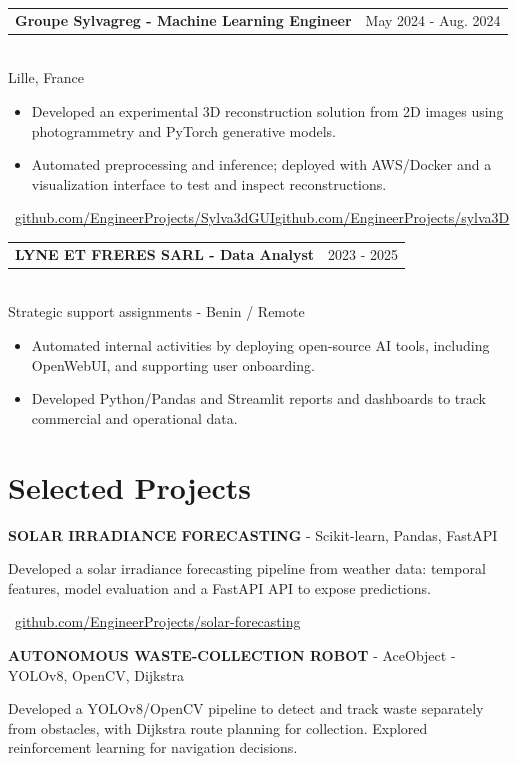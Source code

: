 \documentclass[10pt,a4paper]{article}
\makeatletter
\newcommand{\role}[3]{%
  \vspace{3pt}
  \begin{tabularx}{\linewidth}{@{}Xr@{}}
  \textbf{#1} & {\color{muted}#2}
  \end{tabularx}\vspace{0.8pt}\\
  {\color{muted}#3}\par
  \vspace{3pt}
}
\newcommand{\projectline}[2]{\textbf{#1} - #2\par}
\newcommand{\githublink}[2]{\par{\footnotesize\color{accent}\faIcon{github}\ \href{#1}{#2}}\par}
\newlength{\maincolumnheight}
\makeatother
\begin{document}
\begin{lrbox}{\maincolumnbox}
\begin{minipage}[t]{0.695\textwidth}
\vspace{8pt}
\role{Groupe Sylvagreg - Machine Learning Engineer}{May 2024 - Aug. 2024}{Lille, France}
\begin{itemize}
  \item Developed an experimental 3D reconstruction solution from 2D images using photogrammetry and PyTorch generative models.
  \item Automated preprocessing and inference; deployed with AWS/Docker and a visualization interface to test and inspect reconstructions.
\end{itemize}
{\fontsize{7.5pt}{9pt}\selectfont\color{accent}\ \href{https://github.com/EngineerProjects/Sylva3dGUI}{github.com/EngineerProjects/Sylva3dGUI}\enspace\textbullet\enspace\href{https://github.com/EngineerProjects/sylva3D}{github.com/EngineerProjects/sylva3D}}\par

\vspace{8pt}
\role{LYNE ET FRERES SARL - Data Analyst}{2023 - 2025}{Strategic support assignments - Benin / Remote}
\begin{itemize}
  \item Automated internal activities by deploying open-source AI tools, including OpenWebUI, and supporting user onboarding.
  \item Developed Python/Pandas and Streamlit reports and dashboards to track commercial and operational data.
\end{itemize}

\section{Selected Projects}
\projectline{SOLAR IRRADIANCE FORECASTING}{Scikit-learn, Pandas, FastAPI}
Developed a solar irradiance forecasting pipeline from weather data: temporal features, model evaluation and a FastAPI API to expose predictions.
\githublink{https://github.com/EngineerProjects/solar-forecasting}{github.com/EngineerProjects/solar-forecasting}

\vspace{8pt}
\projectline{AUTONOMOUS WASTE-COLLECTION ROBOT}{AceObject - YOLOv8, OpenCV, Dijkstra}
Developed a YOLOv8/OpenCV pipeline to detect and track waste separately from obstacles, with Dijkstra route planning for collection. Explored reinforcement learning for navigation decisions.

\end{minipage}
\end{lrbox}
\setlength{\maincolumnheight}{\dimexpr\ht\maincolumnbox+\dp\maincolumnbox\relax}
\end{document}
